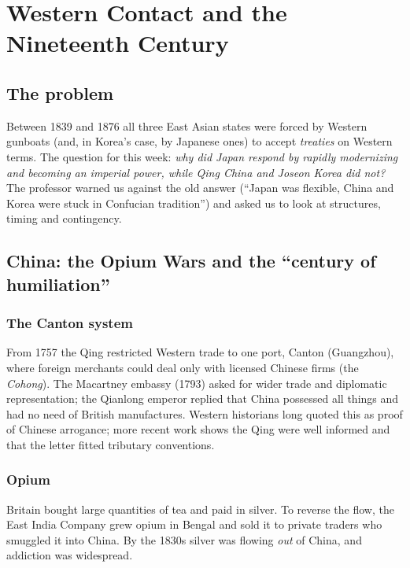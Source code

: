 \chapter{Western Contact and the Nineteenth Century}

\section{The problem}

Between 1839 and 1876 all three East Asian states were forced by Western gunboats (and,
in Korea's case, by Japanese ones) to accept \emph{treaties} on Western terms. The
question for this week: \emph{why did Japan respond by rapidly modernizing and becoming
an imperial power, while Qing China and Joseon Korea did not?} The professor warned us
against the old answer (``Japan was flexible, China and Korea were stuck in Confucian
tradition'') and asked us to look at structures, timing and contingency.

\section{China: the Opium Wars and the ``century of humiliation''}

\subsection{The Canton system}

From 1757 the Qing restricted Western trade to one port, Canton (Guangzhou), where
foreign merchants could deal only with licensed Chinese firms (the \emph{Cohong}). The
Macartney embassy (1793) asked for wider trade and diplomatic representation;
the Qianlong emperor replied that China possessed all things and had no need of British
manufactures. Western historians long quoted this as proof of Chinese arrogance; more
recent work shows the Qing were well informed and that the letter fitted tributary
conventions.

\subsection{Opium}

Britain bought large quantities of tea and paid in silver. To reverse the flow, the East
India Company grew opium in Bengal and sold it to private traders who smuggled it into
China. By the 1830s silver was flowing \emph{out} of China, and addiction was widespread.

